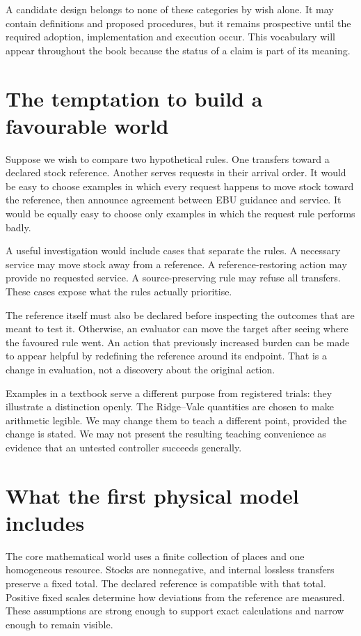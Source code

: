 A candidate design belongs to none of these categories by wish alone. It may contain definitions and proposed procedures, but it remains prospective until the required adoption, implementation and execution occur. This vocabulary will appear throughout the book because the status of a claim is part of its meaning.

\section{The temptation to build a favourable world}
Suppose we wish to compare two hypothetical rules. One transfers toward a declared stock reference. Another serves requests in their arrival order. It would be easy to choose examples in which every request happens to move stock toward the reference, then announce agreement between EBU guidance and service. It would be equally easy to choose only examples in which the request rule performs badly.

A useful investigation would include cases that separate the rules. A necessary service may move stock away from a reference. A reference-restoring action may provide no requested service. A source-preserving rule may refuse all transfers. These cases expose what the rules actually prioritise.

The reference itself must also be declared before inspecting the outcomes that are meant to test it. Otherwise, an evaluator can move the target after seeing where the favoured rule went. An action that previously increased burden can be made to appear helpful by redefining the reference around its endpoint. That is a change in evaluation, not a discovery about the original action.

Examples in a textbook serve a different purpose from registered trials: they illustrate a distinction openly. The Ridge--Vale quantities are chosen to make arithmetic legible. We may change them to teach a different point, provided the change is stated. We may not present the resulting teaching convenience as evidence that an untested controller succeeds generally.

\section{What the first physical model includes}
The core mathematical world uses a finite collection of places and one homogeneous resource. Stocks are nonnegative, and internal lossless transfers preserve a fixed total. The declared reference is compatible with that total. Positive fixed scales determine how deviations from the reference are measured. These assumptions are strong enough to support exact calculations and narrow enough to remain visible.

